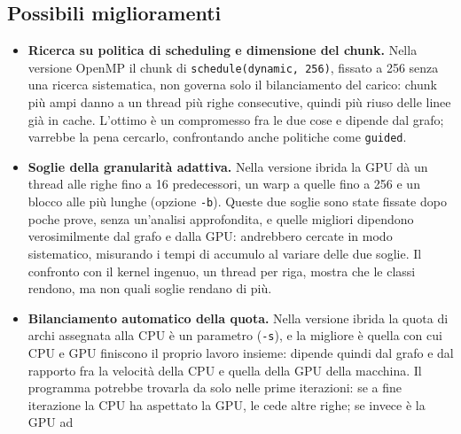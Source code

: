 \documentclass[11pt,a4paper]{article}
\begin{document}
\subsection{Possibili miglioramenti}
\begin{itemize}

  \item \textbf{Ricerca su politica di scheduling e dimensione del chunk.}
    Nella versione OpenMP il chunk di \texttt{schedule(dynamic, 256)}, fissato a 256 senza una
    ricerca sistematica, non governa solo il bilanciamento del carico:
    chunk più ampi danno a un thread più righe consecutive, quindi più riuso delle
    linee già in cache. L'ottimo è un compromesso fra le due cose e dipende
    dal grafo; varrebbe la pena cercarlo, confrontando anche politiche come
    \texttt{guided}.
  \item \textbf{Soglie della granularità adattiva.} Nella versione
    ibrida la GPU dà un thread alle righe fino a 16 predecessori, un warp a
    quelle fino a 256 e un blocco alle più lunghe (opzione \texttt{-b}).
    Queste due soglie sono state fissate dopo poche prove, senza
    un'analisi approfondita, e quelle migliori dipendono verosimilmente dal
    grafo e dalla GPU: andrebbero cercate in modo sistematico, misurando
    i tempi di accumulo al variare delle due soglie.
    Il confronto con il kernel ingenuo, un thread per riga,
    mostra che le classi rendono, ma non quali soglie rendano di più.
  \item \textbf{Bilanciamento automatico della quota.} Nella versione
    ibrida la quota di archi assegnata alla CPU è un parametro
    (\texttt{-s}), e la migliore è quella con cui CPU e GPU finiscono il
    proprio lavoro insieme: dipende quindi dal grafo e dal rapporto fra la
    velocità della CPU e quella della GPU della macchina. Il programma
    potrebbe trovarla da solo nelle prime iterazioni: se a fine iterazione
    la CPU ha aspettato la GPU, le cede altre righe; se invece è la GPU ad

\end{itemize}
\end{document}
